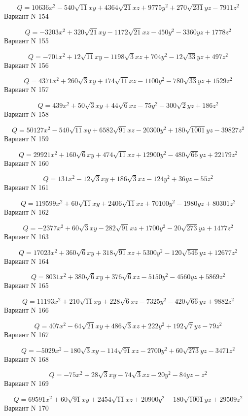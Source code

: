 \documentclass[11pt]{report}
\begin{document}
$$Q = 10636 x^{2} - 540 \sqrt{11} x y + 4364 \sqrt{21} x z + 9775 y^{2} + 270 \sqrt{231} y z - 7911 z^{2}$$Вариант N 154

$$Q = - 3203 x^{2} + 320 \sqrt{21} x y - 1172 \sqrt{21} x z - 450 y^{2} - 3360 y z + 1778 z^{2}$$Вариант N 155

$$Q = - 701 x^{2} + 12 \sqrt{11} x y - 1198 \sqrt{3} x z + 704 y^{2} - 12 \sqrt{33} y z + 497 z^{2}$$Вариант N 156

$$Q = 4371 x^{2} + 260 \sqrt{3} x y + 174 \sqrt{11} x z - 1100 y^{2} - 780 \sqrt{33} y z + 1529 z^{2}$$Вариант N 157

$$Q = 439 x^{2} + 50 \sqrt{3} x y + 44 \sqrt{6} x z - 75 y^{2} - 300 \sqrt{2} y z + 186 z^{2}$$Вариант N 158

$$Q = 50127 x^{2} - 540 \sqrt{11} x y + 6582 \sqrt{91} x z - 20300 y^{2} + 180 \sqrt{1001} y z - 39827 z^{2}$$Вариант N 159

$$Q = 29921 x^{2} + 160 \sqrt{6} x y + 474 \sqrt{11} x z + 12900 y^{2} - 480 \sqrt{66} y z + 22179 z^{2}$$Вариант N 160

$$Q = 131 x^{2} - 12 \sqrt{3} x y + 186 \sqrt{3} x z - 124 y^{2} + 36 y z - 55 z^{2}$$Вариант N 161

$$Q = 119599 x^{2} + 60 \sqrt{11} x y + 2406 \sqrt{11} x z + 70100 y^{2} - 1980 y z + 80301 z^{2}$$Вариант N 162

$$Q = - 2377 x^{2} + 60 \sqrt{3} x y - 282 \sqrt{91} x z + 1700 y^{2} - 20 \sqrt{273} y z + 1477 z^{2}$$Вариант N 163

$$Q = 17023 x^{2} + 360 \sqrt{6} x y + 318 \sqrt{91} x z + 5300 y^{2} - 120 \sqrt{546} y z + 12677 z^{2}$$Вариант N 164

$$Q = 8031 x^{2} + 380 \sqrt{6} x y + 376 \sqrt{6} x z - 5150 y^{2} - 4560 y z + 5869 z^{2}$$Вариант N 165

$$Q = 11193 x^{2} + 210 \sqrt{11} x y + 228 \sqrt{6} x z - 7325 y^{2} - 420 \sqrt{66} y z + 9882 z^{2}$$Вариант N 166

$$Q = 407 x^{2} - 64 \sqrt{21} x y + 486 \sqrt{3} x z + 222 y^{2} + 192 \sqrt{7} y z - 79 z^{2}$$Вариант N 167

$$Q = - 5029 x^{2} - 180 \sqrt{3} x y - 114 \sqrt{91} x z - 2700 y^{2} + 60 \sqrt{273} y z - 3471 z^{2}$$Вариант N 168

$$Q = - 75 x^{2} + 28 \sqrt{3} x y - 74 \sqrt{3} x z - 20 y^{2} - 84 y z - z^{2}$$Вариант N 169

$$Q = 69591 x^{2} + 60 \sqrt{91} x y + 2454 \sqrt{11} x z + 20900 y^{2} - 180 \sqrt{1001} y z + 29509 z^{2}$$Вариант N 170
\end{document}
